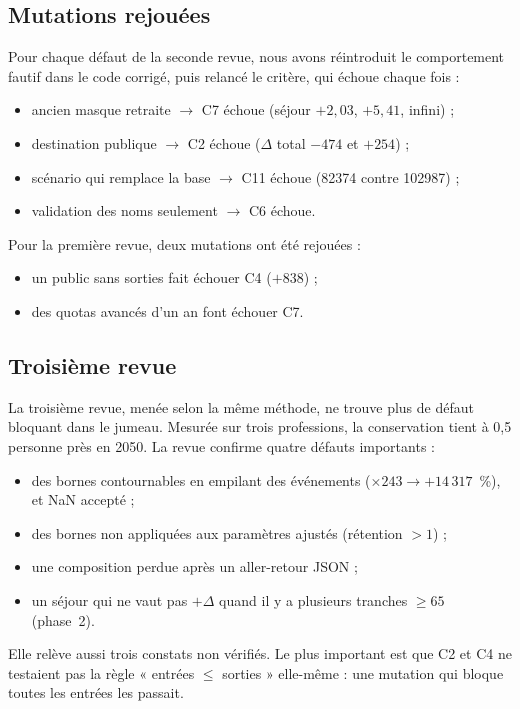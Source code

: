 \documentclass[11pt]{article}
\begin{document}
\subsection{Mutations rejouées}
Pour chaque défaut de la seconde revue, nous avons réintroduit le comportement fautif dans le code
corrigé, puis relancé le critère, qui échoue chaque fois :
\begin{itemize}
  \item ancien masque retraite $\to$ C7 échoue (séjour $+2{,}03$\mesure{}, $+5{,}41$\mesure{},
        infini) ;
  \item destination publique $\to$ C2 échoue ($\Delta$ total $-474$\mesure{} et $+254$\mesure{}) ;
  \item scénario qui remplace la base $\to$ C11 échoue (\num{82374}\mesure{} contre
        \num{102987}\mesure{}) ;
  \item validation des noms seulement $\to$ C6 échoue.
\end{itemize}
Pour la première revue, deux mutations ont été rejouées :
\begin{itemize}
  \item un public sans sorties fait échouer C4 ($+838$\mesure{}) ;
  \item des quotas avancés d'un an font échouer C7.
\end{itemize}

\subsection{Troisième revue}
La troisième revue, menée selon la même méthode, ne trouve plus de défaut bloquant dans le jumeau.
Mesurée sur trois professions, la conservation tient à 0,5\mesure{} personne près en 2050. La revue
confirme quatre défauts importants :
\begin{itemize}
  \item des bornes contournables en empilant des événements ($\times243 \to +14\,317$\mesure{}~\%),
        et NaN accepté ;
  \item des bornes non appliquées aux paramètres ajustés (rétention $> 1$) ;
  \item une composition perdue après un aller-retour JSON ;
  \item un séjour qui ne vaut pas $+\Delta$ quand il y a plusieurs tranches $\ge 65$ (phase~2).
\end{itemize}
Elle relève aussi trois constats non vérifiés. Le plus important est que C2 et C4 ne testaient pas la
règle « entrées $\le$ sorties » elle-même : une mutation qui bloque toutes les entrées les passait.
\end{document}
